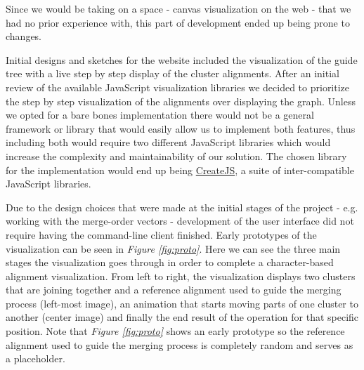 \documentclass[twoside,openright,titlepage,numbers=noenddot,headinclude,%
                footinclude=true,cleardoublepage=empty,abstractoff, %
                BCOR=5mm,paper=a4,fontsize=11pt,%
                ngerman,american,%
                ]{scrreprt}
\begin{document}
Since we would be taking on a space - canvas visualization on the web - that we had no prior experience with, this part of development ended up being  prone to changes.

Initial designs and sketches for the website included the visualization of the guide tree with a live step by step display of the cluster alignments. After an initial review of the available JavaScript visualization libraries we decided to prioritize the step by step visualization of the alignments over displaying the graph. Unless we opted for a bare bones implementation there would not be a general framework or library that would easily allow us to implement both features, thus including both would require two different JavaScript libraries which would increase the complexity and maintainability of our solution. The chosen library for the implementation would end up being \href{https://createjs.com}{CreateJS}, a suite of inter-compatible JavaScript libraries.

Due to the design choices that were made at the initial stages of the project - e.g. working with the merge-order vectors - development of the user interface did not require having the command-line client finished. Early prototypes of the visualization can be seen in \textit{Figure \ref{fig:proto}}. Here we can see the three main stages the visualization goes through in order to complete a character-based alignment visualization. From left to right, the visualization displays two clusters that are joining together and a reference alignment used to guide the merging process (left-most image), an animation that starts moving parts of one cluster to another (center image) and finally the end result of the operation for that specific position. Note that \textit{Figure \ref{fig:proto}} shows an early prototype so the reference alignment used to guide the merging process is completely random and serves as a placeholder.
\end{document}
